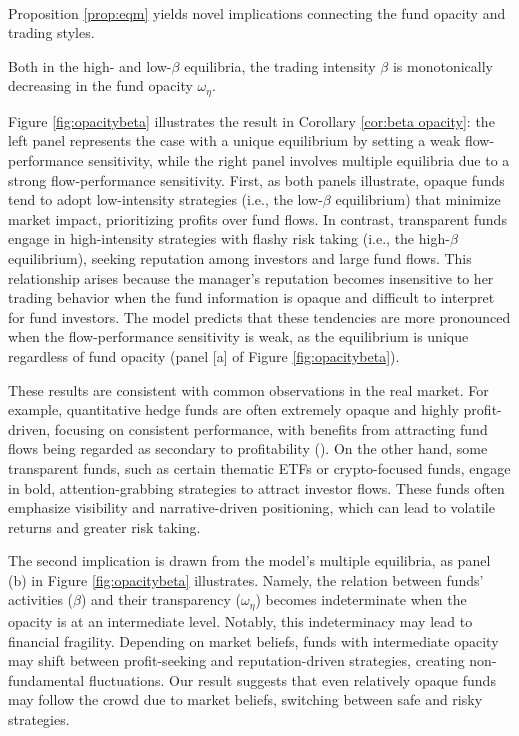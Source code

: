 \paragraph{}
Proposition \ref{prop:eqm} yields novel implications connecting the fund opacity and trading styles.
\begin{corollary}\label{cor:beta opacity}
    Both in the high- and low-$\beta$ equilibria, the trading intensity $\beta$ is monotonically decreasing in the fund opacity $\omega_{\eta}$.
\end{corollary}
Figure \ref{fig:opacitybeta} illustrates the result in Corollary \ref{cor:beta opacity}: the left panel represents the case with a unique equilibrium by setting a weak flow-performance sensitivity, while the right panel involves multiple equilibria due to a strong flow-performance sensitivity.
First, as both panels illustrate, opaque funds tend to adopt low-intensity strategies (i.e., the low-$\beta$ equilibrium) that minimize market impact, prioritizing profits over fund flows. In contrast, transparent funds engage in high-intensity strategies with flashy risk taking (i.e., the high-$\beta$ equilibrium), seeking reputation among investors and large fund flows. This relationship arises because the manager's reputation becomes insensitive to her trading behavior when the fund information is opaque and difficult to interpret for fund investors. The model predicts that these tendencies are more pronounced when the flow-performance sensitivity is weak, as the equilibrium is unique regardless of fund opacity (panel [a] of Figure \ref{fig:opacitybeta}).



These results are consistent with common observations in the real market. For example, quantitative hedge funds are often extremely opaque and highly profit-driven, focusing on consistent performance, with benefits from attracting fund flows being regarded as secondary to profitability (\citealp{schwager2012hedge}). On the other hand, some transparent funds, such as certain thematic ETFs or crypto-focused funds, engage in bold, attention-grabbing strategies to attract investor flows. These funds often emphasize visibility and narrative-driven positioning, which can lead to volatile returns and greater risk taking.

The second implication is drawn from the model's multiple equilibria, as panel (b) in Figure \ref{fig:opacitybeta} illustrates. Namely, the relation between funds' activities ($\beta$) and their transparency ($\omega_{\eta}$) becomes indeterminate when the opacity is at an intermediate level. Notably, this indeterminacy may lead to financial fragility. Depending on market beliefs, funds with intermediate opacity may shift between profit-seeking and reputation-driven strategies, creating non-fundamental fluctuations. Our result suggests that even relatively opaque funds may follow the crowd due to market beliefs, switching between safe and risky strategies.

